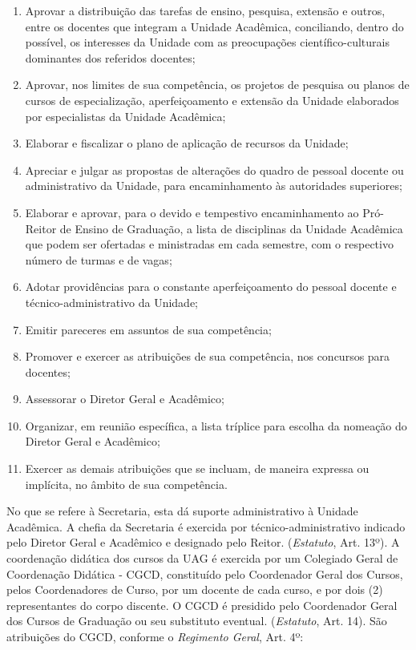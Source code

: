 \documentclass[
	12pt,				%
	openright,			%
  oneside,     %
	a4paper,			%
 hyphens,
	chapter=TITLE,		%
	english,			%
	french,				%
	spanish,			%
	brazil				%
	]{abntex2}
\begin{document}
\begin{enumerate}
    \item Aprovar a distribuição das tarefas de ensino, pesquisa, extensão e outros, entre os docentes que integram a Unidade Acadêmica, conciliando, dentro do possível, os interesses da Unidade com as preocupações científico-culturais dominantes dos referidos docentes;
    \item Aprovar, nos limites de sua competência, os projetos de pesquisa ou planos de cursos de especialização, aperfeiçoamento e extensão da Unidade elaborados por especialistas da Unidade Acadêmica;
    \item Elaborar e fiscalizar o plano de aplicação de recursos da Unidade;
    \item Apreciar e julgar as propostas de alterações do quadro de pessoal docente ou administrativo da Unidade, para encaminhamento às autoridades superiores;
    \item Elaborar e aprovar, para o devido e tempestivo encaminhamento ao Pró-Reitor de Ensino de Graduação, a lista de disciplinas da Unidade Acadêmica que podem ser ofe­rtadas e ministradas em cada semestre, com o respectivo número de turmas e de vagas;
    \item Adotar providências para o 	constante aperfeiçoamento do pessoal docente e 	técnico-administrativo da Unidade;
    \item Emitir pareceres em assuntos de sua competência;
    \item Promover e exercer as atribuições de sua competência, nos concursos para docentes;
    \item Assessorar o Diretor Geral e 	Acadêmico; 
    \item Organizar, em reunião específica, a lista tríplice para escolha da nomeação do Diretor Geral e Acadêmico;
    \item Exercer as demais atribuições que se incluam, de maneira expressa ou implícita, no âmbito de sua 	competência.
\end{enumerate}

No que se refere à Secretaria, esta dá suporte administrativo à Unidade Acadêmica. A chefia da Secretaria é exercida por técnico-administrativo indicado pelo Diretor Geral e Acadêmico e designado pelo Reitor. (\textit{Estatuto}, Art. 13º). A coordenação didática dos cursos da UAG é exercida por um Colegiado Geral de Coordenação Didática - CGCD, constituído pelo Coordenador Geral dos Cursos, pelos Coordenadores de Curso, por um docente de cada curso, e por dois (2) representantes do corpo discente. O CGCD é presidido pelo Coordenador Geral dos Cursos de Graduação ou seu substituto eventual. (\textit{Estatuto}, Art. 14). São atribuições do CGCD, conforme o \textit{Regimento Geral}, Art. 4º:
\end{document}
